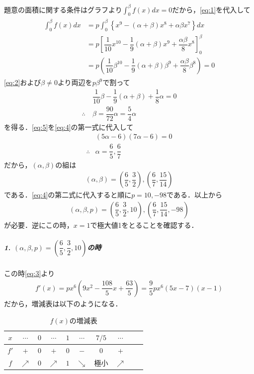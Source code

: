 \documentclass[../../main.tex]{subfiles}
\begin{document}
題意の面積に関する条件はグラフより$\displaystyle\int_0^\beta f(x)dx=0$だから，\cref{eq:1}を代入して
\begin{align}
  \begin{split}
    \int_0^\beta f(x)dx
    &=p\int_0^\beta\left\{x^9-(\alpha+\beta)x^8+\alpha\beta x^7\right\}dx \\
    &=p\left[\dfrac{1}{10}x^{10}-\dfrac{1}{9}(\alpha+\beta)x^9+\dfrac{\alpha\beta}{8}x^8\right]_0^\beta \\
    &=p\left(\dfrac{1}{10}\beta^{10}-\dfrac{1}{9}(\alpha+\beta)\beta^9+\dfrac{\alpha\beta}{8}\beta^8\right)=0
  \end{split}
\end{align}
\cref{eq:2}および$\beta \neq 0$より両辺を$p\beta^9$で割って
\begin{align}
  &\dfrac{1}{10}\beta-\dfrac{1}{9}(\alpha+\beta)+\dfrac{1}{8}\alpha=0 \\
  \therefore\
  &\beta=\dfrac{90}{72}\alpha=\dfrac{5}{4}\alpha \label{eq:5}
\end{align}
を得る．\cref{eq:5}を\cref{eq:4}の第一式に代入して
\begin{align}
  &(5\alpha-6)(7\alpha-6)=0 \\
  \therefore
  &\alpha = \dfrac{6}{5}, \dfrac{6}{7}
\end{align}
だから，$(\alpha,\beta)$の組は
\begin{align}
  (\alpha,\beta)=\left(\dfrac{6}{5},\dfrac{3}{2}\right),\left(\dfrac{6}{7},\dfrac{15}{14}\right)
\end{align}
である．\cref{eq:4}の第二式に代入すると順に$p=10,-98$である．以上から
\begin{align}
  (\alpha,\beta,p)=\left(\dfrac{6}{5},\dfrac{3}{2},10\right),\left(\dfrac{6}{7},\dfrac{15}{14},-98\right)
\end{align}
が必要．逆にこの時，$x=1$で極大値1をとることを確認する．

\subparagraph{1. $(\alpha,\beta,p)=\left(\dfrac{6}{5},\dfrac{3}{2},10\right)$の時}
この時\cref{eq:3}より
\begin{align}
  f'(x)=px^6\left(9x^2-\dfrac{108}{5}x+\dfrac{63}{5}\right)=\dfrac{9}{5}px^6(5x-7)(x-1)
\end{align}
だから，増減表は以下のようになる．

\begin{table}[htb]
  \centering
  \caption{$f(x)$の増減表}
  \begin{tabular}{c|ccccccccc}
    $x$ & $\cdots$ & $0$ & $\cdots$ & $1$ & $\cdots$ & $7/5$ & $\cdots$ \\
    \hline
    $f'$ & $+$ & $0$ & $+$ & $0$ & $-$ & $0$ & $+$ \\
    \hline
    $f$ & $\nearrow$ & $0$ & $\nearrow$ & $1$ & $\searrow$ & 極小 & $\nearrow$
  \end{tabular}
\end{table}
\end{document}
